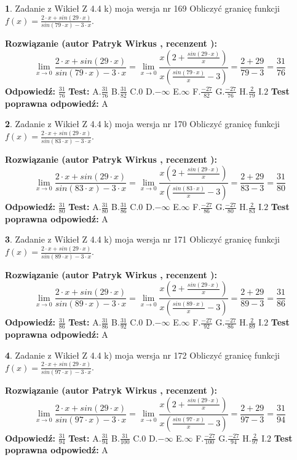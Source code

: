 \documentclass[12pt, a4paper]{article}
\theoremstyle{definition} %
\newtheorem{zad}{}
\newcommand{\zadStart}[1]{\begin{zad}#1\newline}
\newcommand{\zadStop}{\end{zad}}
\newcommand{\rozwStart}[2]{\noindent \textbf{Rozwiązanie (autor #1 , recenzent #2): }\newline}
\newcommand{\rozwStop}{\newline}
\newcommand{\odpStart}{\noindent \textbf{Odpowiedź:}\newline}
\newcommand{\odpStop}{\newline}
\newcommand{\testStart}{\noindent \textbf{Test:}\newline}
\newcommand{\testStop}{\newline}
\newcommand{\kluczStart}{\noindent \textbf{Test poprawna odpowiedź:}\newline}
\newcommand{\kluczStop}{\newline}
\begin{document}
\zadStart{Zadanie z Wikieł Z 4.4 k) moja wersja nr 169}
Obliczyć granicę funkcji $f(x)=\frac{2\cdot x +sin(29\cdot x)}{sin(79\cdot x) -3\cdot x}$.
\zadStop
\rozwStart{Patryk Wirkus}{}
$$\lim\limits_{x\to 0}\frac{2\cdot x +sin(29\cdot x)}{sin(79\cdot x) -3\cdot x}
=\lim\limits_{x\to 0}\frac{x(2+\frac{sin(29\cdot x)}{x})}{x(\frac{sin(79\cdot x)}{x}-3)}
=\frac{2+29}{79-3} = \frac{31}{76}$$
\rozwStop
\odpStart
$\frac{31}{76}$
\odpStop
\testStart
A.$\frac{31}{76}$
B.$\frac{31}{82}$
C.$0$
D.$-\infty$
E.$\infty$
F.$\frac{-27}{82}$
G.$\frac{-27}{76}$
H.$\frac{2}{79}$
I.$2$
\testStop
\kluczStart
A
\kluczStop



\zadStart{Zadanie z Wikieł Z 4.4 k) moja wersja nr 170}
Obliczyć granicę funkcji $f(x)=\frac{2\cdot x +sin(29\cdot x)}{sin(83\cdot x) -3\cdot x}$.
\zadStop
\rozwStart{Patryk Wirkus}{}
$$\lim\limits_{x\to 0}\frac{2\cdot x +sin(29\cdot x)}{sin(83\cdot x) -3\cdot x}
=\lim\limits_{x\to 0}\frac{x(2+\frac{sin(29\cdot x)}{x})}{x(\frac{sin(83\cdot x)}{x}-3)}
=\frac{2+29}{83-3} = \frac{31}{80}$$
\rozwStop
\odpStart
$\frac{31}{80}$
\odpStop
\testStart
A.$\frac{31}{80}$
B.$\frac{31}{86}$
C.$0$
D.$-\infty$
E.$\infty$
F.$\frac{-27}{86}$
G.$\frac{-27}{80}$
H.$\frac{2}{83}$
I.$2$
\testStop
\kluczStart
A
\kluczStop



\zadStart{Zadanie z Wikieł Z 4.4 k) moja wersja nr 171}
Obliczyć granicę funkcji $f(x)=\frac{2\cdot x +sin(29\cdot x)}{sin(89\cdot x) -3\cdot x}$.
\zadStop
\rozwStart{Patryk Wirkus}{}
$$\lim\limits_{x\to 0}\frac{2\cdot x +sin(29\cdot x)}{sin(89\cdot x) -3\cdot x}
=\lim\limits_{x\to 0}\frac{x(2+\frac{sin(29\cdot x)}{x})}{x(\frac{sin(89\cdot x)}{x}-3)}
=\frac{2+29}{89-3} = \frac{31}{86}$$
\rozwStop
\odpStart
$\frac{31}{86}$
\odpStop
\testStart
A.$\frac{31}{86}$
B.$\frac{31}{92}$
C.$0$
D.$-\infty$
E.$\infty$
F.$\frac{-27}{92}$
G.$\frac{-27}{86}$
H.$\frac{2}{89}$
I.$2$
\testStop
\kluczStart
A
\kluczStop



\zadStart{Zadanie z Wikieł Z 4.4 k) moja wersja nr 172}
Obliczyć granicę funkcji $f(x)=\frac{2\cdot x +sin(29\cdot x)}{sin(97\cdot x) -3\cdot x}$.
\zadStop
\rozwStart{Patryk Wirkus}{}
$$\lim\limits_{x\to 0}\frac{2\cdot x +sin(29\cdot x)}{sin(97\cdot x) -3\cdot x}
=\lim\limits_{x\to 0}\frac{x(2+\frac{sin(29\cdot x)}{x})}{x(\frac{sin(97\cdot x)}{x}-3)}
=\frac{2+29}{97-3} = \frac{31}{94}$$
\rozwStop
\odpStart
$\frac{31}{94}$
\odpStop
\testStart
A.$\frac{31}{94}$
B.$\frac{31}{100}$
C.$0$
D.$-\infty$
E.$\infty$
F.$\frac{-27}{100}$
G.$\frac{-27}{94}$
H.$\frac{2}{97}$
I.$2$
\testStop
\kluczStart
A
\kluczStop
\end{document}
